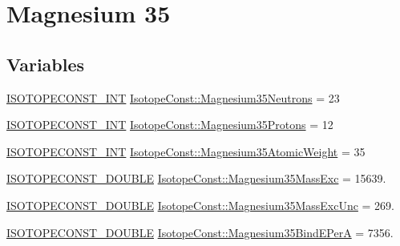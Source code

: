 \hypertarget{group___isotope_const-_magnesium-_mg35}{}\section{Magnesium 35}
\label{group___isotope_const-_magnesium-_mg35}
\subsection*{Variables}
\begin{DoxyCompactItemize}
\item 
\mbox{\hyperlink{group___isotope_const-_macros_ga5f18360b3e99483a35c32d789e62621c}{I\+S\+O\+T\+O\+P\+E\+C\+O\+N\+S\+T\+\_\+\+I\+NT}} \mbox{\hyperlink{group___isotope_const-_magnesium-_mg35_ga39d60de0b20535235a522c814bb25247}{Isotope\+Const\+::\+Magnesium35\+Neutrons}} = 23
\item 
\mbox{\hyperlink{group___isotope_const-_macros_ga5f18360b3e99483a35c32d789e62621c}{I\+S\+O\+T\+O\+P\+E\+C\+O\+N\+S\+T\+\_\+\+I\+NT}} \mbox{\hyperlink{group___isotope_const-_magnesium-_mg35_gadcdd981bd108d6307abe55574fe20ebf}{Isotope\+Const\+::\+Magnesium35\+Protons}} = 12
\item 
\mbox{\hyperlink{group___isotope_const-_macros_ga5f18360b3e99483a35c32d789e62621c}{I\+S\+O\+T\+O\+P\+E\+C\+O\+N\+S\+T\+\_\+\+I\+NT}} \mbox{\hyperlink{group___isotope_const-_magnesium-_mg35_ga6d72f26419876a72b031dcf028319aeb}{Isotope\+Const\+::\+Magnesium35\+Atomic\+Weight}} = 35
\item 
\mbox{\hyperlink{group___isotope_const-_macros_ga8f45a7272ce02c0b4c65c44636ed719a}{I\+S\+O\+T\+O\+P\+E\+C\+O\+N\+S\+T\+\_\+\+D\+O\+U\+B\+LE}} \mbox{\hyperlink{group___isotope_const-_magnesium-_mg35_ga4f2c581400ebc41f06a67e216a019678}{Isotope\+Const\+::\+Magnesium35\+Mass\+Exc}} = 15639.
\item 
\mbox{\hyperlink{group___isotope_const-_macros_ga8f45a7272ce02c0b4c65c44636ed719a}{I\+S\+O\+T\+O\+P\+E\+C\+O\+N\+S\+T\+\_\+\+D\+O\+U\+B\+LE}} \mbox{\hyperlink{group___isotope_const-_magnesium-_mg35_ga07d0839252ad10127bf31a4f9f360127}{Isotope\+Const\+::\+Magnesium35\+Mass\+Exc\+Unc}} = 269.
\item 
\mbox{\hyperlink{group___isotope_const-_macros_ga8f45a7272ce02c0b4c65c44636ed719a}{I\+S\+O\+T\+O\+P\+E\+C\+O\+N\+S\+T\+\_\+\+D\+O\+U\+B\+LE}} \mbox{\hyperlink{group___isotope_const-_magnesium-_mg35_ga3cb14b0bb6e9582d48c5e1baa1337326}{Isotope\+Const\+::\+Magnesium35\+Bind\+E\+PerA}} = 7356.
\item 

\end{DoxyCompactItemize}
